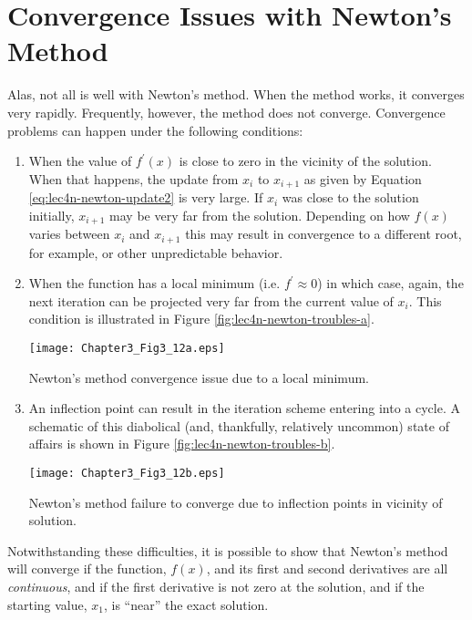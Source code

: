 \section{Convergence Issues with Newton's Method}
Alas, not all is well with Newton's method.  When the method works, it converges very rapidly.  Frequently, however, the method does not converge.  Convergence problems can happen under the following conditions:
\begin{enumerate}
\item When the value of $f^{\prime}(x)$ is close to zero in the vicinity of the solution.  When that happens, the update from $x_i$ to $x_{i+1}$ as given by Equation \ref{eq:lec4n-newton-update2} is very large.  If $x_i$ was close to the solution initially, $x_{i+1}$ may be very far from the solution.  Depending on how $f(x)$ varies between $x_i$ and $x_{i+1}$ this may result in convergence to a different root, for example, or other unpredictable behavior.

\item When the function has a local minimum (i.e. $f^{\prime} \approx 0$) in which case, again, the next iteration can be projected very far from the current value of $x_i$.  This condition is illustrated in Figure \ref{fig:lec4n-newton-troubles-a}.
\begin{marginfigure}[-4.0cm]
\texttt{[image: Chapter3\_Fig3\_12a.eps]}
\caption{Newton's method convergence issue due to a local minimum.}
\label{fig:lec4n-newton-troubles-a}
\end{marginfigure}

\item An inflection point can result in the iteration scheme entering into a cycle.  A schematic of this diabolical (and, thankfully, relatively uncommon) state of affairs is shown in Figure \ref{fig:lec4n-newton-troubles-b}.

\begin{marginfigure}
\texttt{[image: Chapter3\_Fig3\_12b.eps]}
\caption{Newton's method failure to converge due to inflection points in vicinity of solution.}
\label{fig:lec4n-newton-troubles-b}
\end{marginfigure}


\end{enumerate}
Notwithstanding these difficulties, it is possible to show that Newton's method will converge if the function, $f(x)$, and its first and second derivatives are all \emph{continuous}, and if the first derivative is not zero at the solution, and if the starting value, $x_1$, is ``near'' the exact solution.

